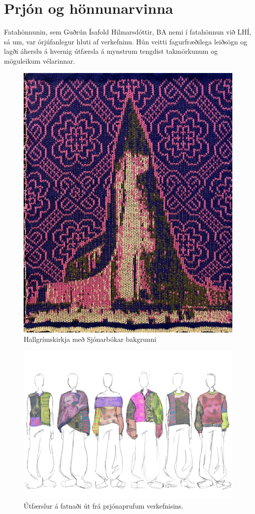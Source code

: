 \documentclass[a4paper,12pt]{article}
\begin{document}
\section{Prjón og hönnunarvinna}
Fatahönnunin, sem Guðrún Ísafold Hilmarsdóttir, BA nemi í fatahönnun við LHÍ, sá um,
var órjúfanlegur hluti af verkefninu. Hún veitti fagurfræðilega leiðsögn og lagði áherslu á
hvernig útfærsla á mynstrum tengdist takmörkunum og möguleikum vélarinnar.



\begin{figure}
    \centering
    \includegraphics[width=0.5\linewidth]{figs/hallgrimskirkja.JPG}
    \caption{Hallgrímskirkja með Sjónarbókar bakgrunni}
    \label{fig:hallgrimskirkja}
\end{figure}


\begin{figure}
    \centering
    \includegraphics[width=0.8\linewidth]{figs/collection.JPG}
    \caption{Útfærslur á fatnaði út frá prjónaprufum verkefnisins.}
    \label{fig:collection}
\end{figure}
\end{document}
